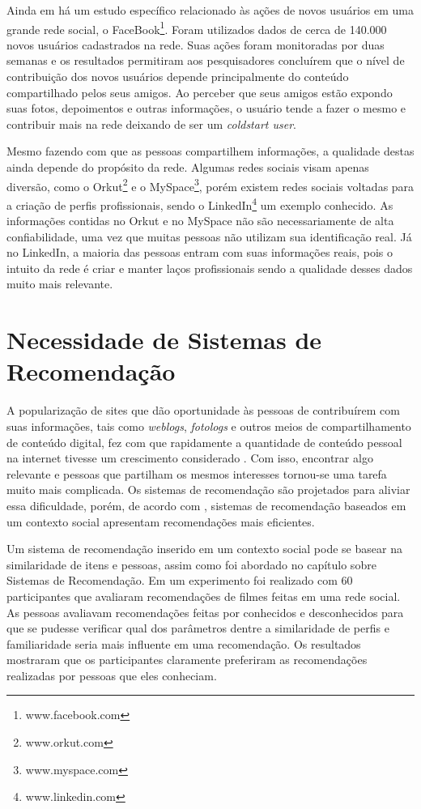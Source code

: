 Ainda em \cite{burke2009fmm} há um estudo específico relacionado às ações de novos usuários em uma grande rede social, o FaceBook\footnote{www.facebook.com}. Foram utilizados dados de cerca de 140.000 novos usuários cadastrados na rede. Suas ações foram monitoradas por duas semanas e os resultados permitiram aos pesquisadores concluírem que o nível de contribuição dos novos usuários depende principalmente do conteúdo compartilhado pelos seus amigos. Ao perceber que seus amigos estão expondo suas fotos, depoimentos e outras informações, o usuário tende a fazer o mesmo e contribuir mais na rede deixando de ser um \textit{coldstart user}.

Mesmo fazendo com que as pessoas compartilhem informações, a qualidade destas ainda depende do propósito da rede. Algumas redes sociais visam apenas diversão, como o Orkut\footnote{www.orkut.com} e o MySpace\footnote{www.myspace.com}, porém existem redes sociais voltadas para a criação de perfis profissionais, sendo o LinkedIn\footnote{www.linkedin.com} um exemplo conhecido. As informações contidas no Orkut e no MySpace não são necessariamente de alta confiabilidade, uma vez que muitas pessoas não utilizam sua identificação real. Já no LinkedIn, a maioria das pessoas entram com suas informações reais, pois o intuito da rede é criar e manter laços profissionais sendo a qualidade desses dados muito mais relevante.

\section{Necessidade de Sistemas de Recomendação}

A popularização de sites que dão oportunidade às pessoas de contribuírem com suas informações, tais como \textit{weblogs}, \textit{fotologs} e outros meios de compartilhamento de conteúdo digital, fez com que rapidamente a quantidade de conteúdo pessoal na internet tivesse um crescimento considerado \cite{bonhard2007devil}. Com isso, encontrar algo relevante e pessoas que partilham os mesmos interesses tornou-se uma tarefa muito mais complicada. Os sistemas de recomendação são projetados para aliviar essa dificuldade, porém, de acordo com \cite{bonhard2007devil}, sistemas de recomendação baseados em um contexto social apresentam recomendações mais eficientes.

Um sistema de recomendação inserido em um contexto social pode se basear na similaridade de itens e pessoas, assim como foi abordado no capítulo sobre Sistemas de Recomendação. Em \cite{bonhard2007devil} um experimento foi realizado com 60 participantes que avaliaram recomendações de filmes feitas em uma rede social. As pessoas avaliavam recomendações feitas por conhecidos e desconhecidos para que se pudesse verificar qual dos parâmetros dentre a similaridade de perfis e familiaridade seria mais influente em uma recomendação. Os resultados mostraram que os participantes claramente preferiram as recomendações realizadas por pessoas que eles conheciam.


